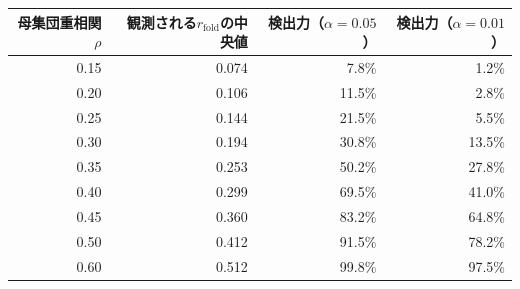 \begin{tabular}{rrrr}
\toprule
母集団重相関 $\rho$ & 観測される$r_{\text{fold}}$の中央値 & 検出力（$\alpha = 0.05$） & 検出力（$\alpha = 0.01$） \\
\midrule
0.15 & 0.074 & 7.8\% & 1.2\% \\
0.20 & 0.106 & 11.5\% & 2.8\% \\
0.25 & 0.144 & 21.5\% & 5.5\% \\
0.30 & 0.194 & 30.8\% & 13.5\% \\
0.35 & 0.253 & 50.2\% & 27.8\% \\
0.40 & 0.299 & 69.5\% & 41.0\% \\
0.45 & 0.360 & 83.2\% & 64.8\% \\
0.50 & 0.412 & 91.5\% & 78.2\% \\
0.60 & 0.512 & 99.8\% & 97.5\% \\
\bottomrule
\end{tabular}
